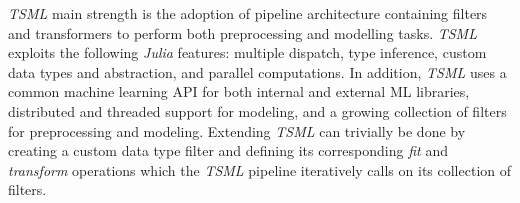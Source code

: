 \documentclass{juliacon}
\begin{document}
\emph{TSML} main strength is the adoption of pipeline architecture containing filters and transformers to perform both preprocessing and modelling tasks. \emph{TSML}  exploits the following \emph{Julia} features: multiple dispatch, type inference, custom data types and abstraction, and parallel computations.  In addition, \emph{TSML} uses a common machine learning API for both internal and external ML libraries, distributed and threaded support for modeling, and a growing collection of filters for preprocessing and modeling. Extending \emph{TSML} can trivially be done by creating a custom data type filter and defining its corresponding \emph{fit} and \emph{transform} operations which the \emph{TSML} pipeline iteratively calls on its collection of filters.



\end{document}
